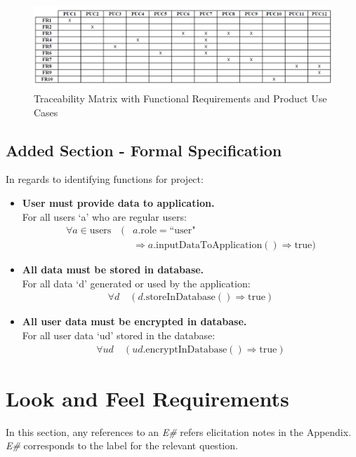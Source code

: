 \documentclass[12pt]{article}
\begin{document}
\begin{figure}[H]
  \centering
  \includegraphics[width=\textwidth]{traceabilitymatrix}
  \caption{Traceability Matrix with Functional Requirements and Product Use Cases}
  \label{fig:traceabilitymatrix}
\end{figure}

\subsection{Added Section - Formal Specification}
In regards to identifying functions for project:
\begin{itemize}
    \item \textbf{User must provide data to application.}\\
    For all users `a' who are regular users:
    \[
    \begin{split}
        \forall a \in \text{users} \quad (& a.\text{role} = \text{``user"}\\
        & \Rightarrow a.\text{inputDataToApplication}() \Rightarrow \text{true})
    \end{split}
    \]

    \item \textbf{All data must be stored in database.}\\
    For all data `d' generated or used by the application:
    \[
    \begin{split}
        \forall d \quad (d.\text{storeInDatabase}() \Rightarrow \text{true})
    \end{split}
    \]
    
    \item \textbf{All user data must be encrypted in database.}\\
    For all user data `ud' stored in the database:
    \[
    \begin{split}
        \forall ud \quad (ud.\text{encryptInDatabase}() \Rightarrow \text{true})
    \end{split}
    \]
    
\end{itemize}

\section{Look and Feel Requirements}
In this section, any references to an \textit{E\#} refers elicitation notes in the Appendix. \textit{E\#} corresponds
to the label for the relevant question.
\end{document}
